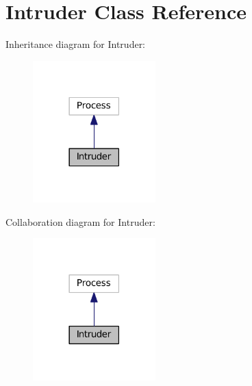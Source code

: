 \hypertarget{classIntruder}{\section{Intruder Class Reference}
\label{classIntruder}
}


Inheritance diagram for Intruder\+:
\nopagebreak
\begin{figure}[H]
\begin{center}
\leavevmode
\includegraphics[width=134pt]{classIntruder__inherit__graph}
\end{center}
\end{figure}


Collaboration diagram for Intruder\+:
\nopagebreak
\begin{figure}[H]
\begin{center}
\leavevmode
\includegraphics[width=134pt]{classIntruder__coll__graph}
\end{center}
\end{figure}
